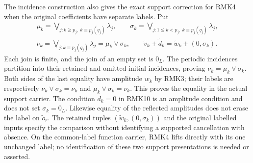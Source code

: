 \documentclass[11pt]{article}
\begin{document}
The incidence construction also gives the exact support correction
for RMK4 when the original coefficients have separate labels.
Put
\begin{equation}\tag{RMK32}
\begin{gathered}
 \mu_k=\bigvee_{j:k\geq p_j,\ k\equiv p_j(q_j)}\lambda_j,
 \qquad
 \sigma_k=\bigvee_{j:1\leq k<p_j,\ k\equiv p_j(q_j)}\lambda_j,\\
 \nu_k=\bigvee_{j:k\equiv p_j(q_j)}\lambda_j
       =\mu_k\vee\sigma_k,\qquad
 \widetilde v_k+\widetilde d_k
       =\widetilde w_k+(0,\sigma_k).
\end{gathered}
\end{equation}
Each join is finite, and the join of an empty set is $0_L$.
The periodic incidences partition into their retained and omitted
initial incidences, proving $\nu_k=\mu_k\vee\sigma_k$. Both sides
of the last equality have amplitude $w_k$ by RMK3; their labels
are respectively $\nu_k\vee\sigma_k=\nu_k$ and
$\mu_k\vee\sigma_k=\nu_k$. This proves the equality in the actual
support carrier. The condition $d_k=0$ in RMK10 is an amplitude
condition and does not set $\sigma_k=0_L$. Likewise equality of
the reflected amplitudes does not erase the label on
$\widetilde o_r$. The retained tuples $(\widetilde w_k,(0,\sigma_k))$
and the original labelled inputs specify the comparison without
identifying a supported cancellation with absence. On the
common-label function carrier, RMK4 lifts directly with its one
unchanged label; no identification of these two support
presentations is needed or asserted.

\clearpage
\end{document}
